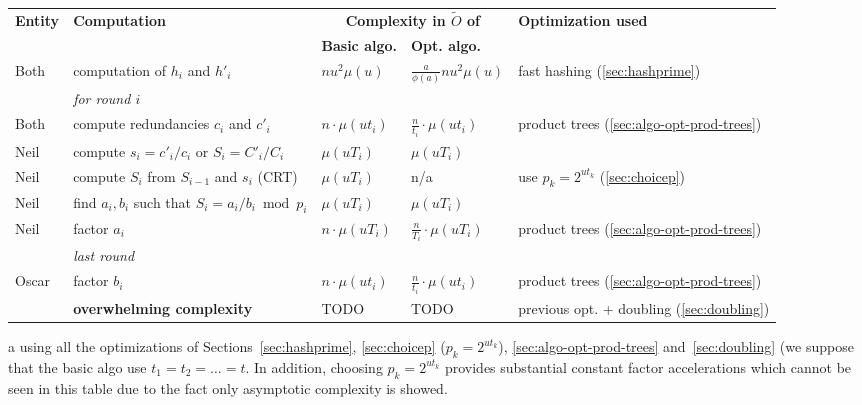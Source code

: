 \documentclass[11pt]{llncs}
\newcommand{\Oapp}{\ensuremath{\tilde{O}}}
\begin{document}
\begin{table}[ht]
 \begin{threeparttable}
  \begin{tabularx}{\textwidth}{lXC{2cm}C{2cm}p{4.2cm}}
\toprule
{\bf \hfill Entity \hfill \null} & {\bf \hfill Computation \hfill \null} &  \multicolumn{2}{c}{{\bf Complexity in $\Oapp$ of}} & {\bf \hfill Optimization used \hfill \null} \\
\cmidrule(lr){3-4}
& & {\bf Basic algo.} & {\bf Opt. algo.} \\
\midrule
Both  & computation of $h_i$ and $h'_i$ 
      & $n u^2 \mu(u)$ 
      & $\frac{a}{\phi(a)} n u^2 \mu(u)$
      & fast hashing (\ref{sec:hashprime}) \\
\midrule
      & \textit{for round $i$} &  &  \\
Both  & compute redundancies $c_i$ and $c'_i$ 
      & $n \cdot \mu(ut_i)$ 
      & $\frac{n}{t_i} \cdot \mu(ut_i)$
      & product trees (\ref{sec:algo-opt-prod-trees}) \\
Neil  & compute $s_i = c'_i/c_i$ or $S_i = C'_i / C_i$
      & $\mu(uT_i)$
      & $\mu(uT_i)$
      &   \\
Neil  & compute $S_i$ from $S_{i-1}$ and $s_i$ (CRT)
      & $\mu(u T_i)$ 
      & n/a
      & use $p_k = 2^{ut_k}$ (\ref{sec:choicep}) \\
Neil  & find $a_i,b_i$ such that $S_i = a_i/b_i \bmod p_i$
      & $\mu(u T_i)$
      & $\mu(u T_i)$
      & \\
Neil  & factor $a_i$
      & $n \cdot \mu(uT_i)$ 
      & $\frac{n}{T_i} \cdot \mu(uT_i)$
      & product trees (\ref{sec:algo-opt-prod-trees})  \\
\midrule
      & \textit{last round} \\
Oscar & factor $b_i$
      & $n \cdot \mu(ut_i)$ 
      & $\frac{n}{t_i} \cdot \mu(ut_i)$
      & product trees (\ref{sec:algo-opt-prod-trees}) \\
\midrule
      & \textbf{overwhelming complexity}
      & TODO 
      & TODO 
      & previous opt. + doubling (\ref{sec:doubling}) \\
\bottomrule
  \end{tabularx}
  \begin{tablenotes}
    \item[a] using all the optimizations of Sections~\ref{sec:hashprime}, \ref{sec:choicep} ($p_k = 2^{ut_k}$), \ref{sec:algo-opt-prod-trees} and~\ref{sec:doubling} (we suppose that the basic algo use $t_1=t_2=\dots=t$. In addition, choosing $p_k = 2^{ut_k}$ provides substantial constant factor accelerations which cannot be seen in this table due to the fact only asymptotic complexity is showed.

\end{tablenotes}
\end{threeparttable}
\end{table}
\end{document}
